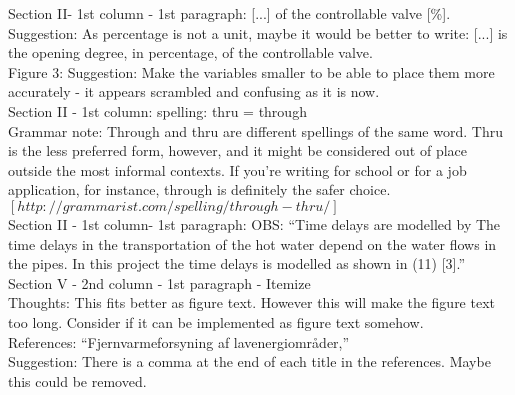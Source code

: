 \noindent Section II- 1st column - 1st paragraph: [...] of the controllable valve [\%].\\
Suggestion: As percentage is not a unit, maybe it would be better to write: [...] is the opening degree, in percentage, of the controllable valve. \\


\noindent Figure 3: Suggestion: Make the variables smaller to be able to place them more accurately - it appears scrambled and confusing as it is now.\\


\noindent Section II - 1st column: spelling: thru = through\\
Grammar note: Through and thru are different spellings of the same word. Thru is the less preferred form, however, and it might be considered out of place outside the most informal contexts. If you’re writing for school or for a job application, for instance, through is definitely the safer choice.\\ 
$[http://grammarist.com/spelling/through-thru/]$\\


\noindent Section II - 1st column- 1st paragraph: OBS: “Time delays are modelled by The time delays in the transportation of the hot water depend on the water flows in the pipes. In this project the time delays is modelled as shown in (11) [3].”\\

\noindent Section V - 2nd column - 1st paragraph - Itemize\\				
Thoughts: This fits better as figure text. However this will make the figure text too long. Consider if it can be implemented as figure text somehow. \\


\noindent References: “Fjernvarmeforsyning af lavenergiområder,”\\
Suggestion: There is a comma at the end of each title in the references. Maybe this could be removed. \\


